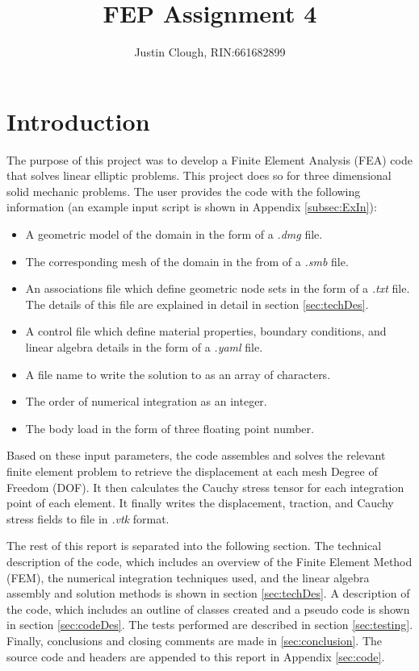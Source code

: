 \documentclass[a4paper, 12pt]{article}
\author{Justin Clough, RIN:661682899}
\title{FEP Assignment 4}
\begin{document}
\maketitle

\newpage
\section{Introduction} \label{sec:intro}
The purpose of this project was to develop a Finite
Element Analysis (FEA) code that solves linear 
elliptic problems. This project does so for 
three dimensional solid mechanic problems. The user 
provides the code with the following information 
(an example input script is shown in 
Appendix \ref{subsec:ExIn}):

\begin{itemize}
  \item A geometric model of the domain in the 
        form of a \emph{.dmg} file.
  \item The corresponding mesh of the domain in the 
        from of a \emph{.smb} file.
  \item An associations file which define geometric
        node sets in the form of a \emph{.txt} file. The
        details of this file are explained in detail in 
        section \ref{sec:techDes}.
  \item A control file which define material properties,
        boundary conditions, and linear algebra details in 
        the form of a \emph{.yaml} file.
  \item A file name to write the solution to as an array of
        characters.
  \item The order of numerical integration as an integer.
  \item The body load in the form of three floating point 
        number.
\end{itemize}

Based on these input parameters, the code assembles and
solves the relevant finite element problem to retrieve 
the displacement at each mesh Degree of Freedom (DOF).
It then calculates the Cauchy stress tensor for each 
integration point of each element. It finally writes 
the displacement, traction, and Cauchy stress fields to 
file in \emph{.vtk} format. 

The rest of this report is separated into the following
section. The technical description of the code, which 
includes an overview of the Finite Element Method (FEM),
the numerical integration techniques used, and the
linear algebra assembly and solution methods is shown in 
section \ref{sec:techDes}. A description of the code, which 
includes an outline of classes created and a pseudo code
is shown in section \ref{sec:codeDes}. The tests performed
are described in section \ref{sec:testing}. Finally, 
conclusions and closing comments are made 
in \ref{sec:conclusion}. The source code and headers
are appended to this report in Appendix \ref{sec:code}.
\end{document}
